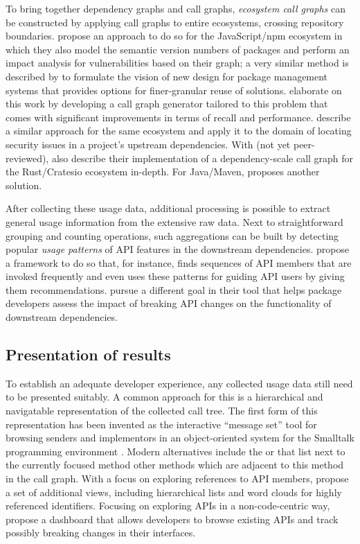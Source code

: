 To bring together dependency graphs and call graphs, \emph{ecosystem call graphs} can be constructed by applying call graphs to entire ecosystems, crossing repository boundaries.
\citet{hejderup2018software} propose an approach to do so for the JavaScript/npm ecosystem in which they also model the semantic version numbers of packages and perform an impact analysis for vulnerabilities based on their graph; a very similar method is described by \citet{boldi2020fine} to formulate the vision of new design for package management systems that provides options for finer-granular reuse of solutions.
\citet{nielsen2021modular} elaborate on this work by developing a call graph generator tailored to this problem that comes with significant improvements in terms of recall and performance.
\citet{wang2020empirical} describe a similar approach for the same ecosystem and apply it to the domain of locating security issues in a project's upstream dependencies.
With  (not yet peer-reviewed), \citet{hejderup2021praezi} also describe their implementation of a dependency-scale call graph for the Rust/Cratesio ecosystem in-depth.
For Java/Maven, \citet{keshani2021scalable} proposes another solution.

After collecting these usage data, additional processing is possible to extract general usage information from the extensive raw data.
Next to straightforward grouping and counting operations, such aggregations can be built by detecting popular \emph{usage patterns} of API features in the downstream dependencies.
\citet{zhong2009mapo} propose a framework to do so that, for instance, finds sequences of API members that are invoked frequently and even uses these patterns for guiding API users by giving them recommendations.
\citet{hanam2019aiding} pursue a different goal in their tool that helps package developers assess the impact of breaking API changes on the functionality of downstream dependencies.

\subsection{Presentation of results}
\label{sec:related_work/presentation}

To establish an adequate developer experience, any collected usage data still need to be presented suitably.
A common approach for this is a hierarchical and navigatable representation of the collected call tree.
The first form of this representation has been invented as the interactive ``message set'' tool for browsing senders and implementors in an object-oriented system for the Smalltalk programming environment \citep[section~10.1f.]{goldberg1984smalltalk}.
Modern alternatives include the  \citep{karrer2011stacksplorer} or  \citep{kramer2012blaze} that list next to the currently focused method other methods which are adjacent to this method in the call graph.
With a focus on exploring references to API members, \citet{de2013multi} propose a set of additional views, including hierarchical lists and word clouds for highly referenced identifiers.
Focusing on exploring APIs in a non-code-centric way, \citet{hora2015apiwave} propose a dashboard that allows developers to browse existing APIs and track possibly breaking changes in their interfaces.
